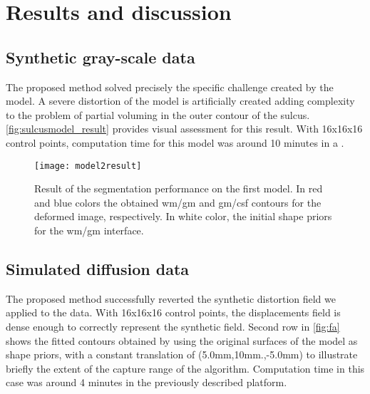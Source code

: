 \section{Results and discussion}
\label{sec:results}

\subsection{Synthetic gray-scale data}
The proposed method solved precisely the specific challenge
created by the model. A severe distortion of the model is
artificially created adding complexity to the problem of
partial voluming in the outer contour of the sulcus.
\autoref{fig:sulcusmodel_result} provides visual assessment
for this result. With 16x16x16 control points, 
computation time for this model was around
10 minutes in a {\color{red}{(specific machine details)}}.
\begin{figure}
\texttt{[image: model2result]}
\caption{Result of the segmentation performance on the first
model. In red and blue colors the obtained \ac{wm}/\ac{gm} 
and \ac{gm}/\ac{csf} contours for the deformed image, respectively.
In white color, the initial shape priors for the \ac{wm}/\ac{gm}
interface.
{\color{red}{This figure is to be replaced by the real result,
this is a proof of concept of registration that does not solve
the pv problem. The current figure also removes the outer prior}}}
\label{fig:sulcusmodel_result}
\end{figure}


\subsection{Simulated diffusion data}
%
The proposed method successfully reverted the synthetic distortion
field we applied to the data. With 16x16x16 control points, the
displacements field is dense enough to correctly represent the
synthetic field. Second row in \autoref{fig:fa} shows the fitted
contours obtained by using the original surfaces of the model
as shape priors, with a constant translation of (5.0mm,10mm.,-5.0mm)
to illustrate briefly the extent of the capture range of the algorithm.
Computation time in this case was around 4 minutes in the previously
described platform. \\
%

